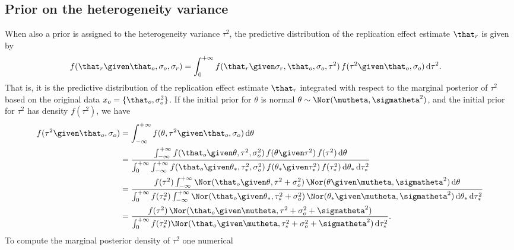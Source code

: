 \begin{subappendices}
\subsection{Prior on the heterogeneity variance}
\label{sec3sup:priortau}
When also a prior is assigned to the heterogeneity variance $\tau^{2}$, the
predictive distribution of the replication effect estimate $\that_{r}$ is given
by
\begin{align*}
  f(\that_{r} \given \that_{o}, \sigma_{o}, \sigma_{r})
  &= \int_{0}^{+\infty} f(\that_{r} \given \sigma_{r}, \that_{o}, \sigma_{o},
    \tau^{2}) \,
    f(\tau^{2} \given \that_{o}, \sigma_{o}) \, \text{d}\tau^{2}.
\end{align*}
That is, it is the predictive distribution of the replication effect estimate
$\that_{r}$ integrated with respect to the marginal posterior of $\tau^{2}$
based on the original data $x_{o} = \{\that_{o}, \sigma^{2}_{o}\}$. If the
initial prior for $\theta$ is normal
$\theta \sim \Nor(\mutheta, \sigmatheta^{2})$, and the initial prior for
$\tau^{2}$ has density $f(\tau^{2})$, we have
\begin{align*}
  f(\tau^{2} \given \that_{o}, \sigma_{o})
  &= \int_{-\infty}^{+\infty} f(\theta, \tau^{2} \given \that_{o}, \sigma_{o}) \, \text{d}\theta \\
  &= \frac{\int_{-\infty}^{+\infty} f(\that_{o} \given \theta, \tau^{2}, \sigma^{2}_{o}) \,
    f(\theta \given \tau^{2}) \, f(\tau^{2}) \, \text{d}\theta}{\int_{0}^{+\infty}
    \int_{-\infty}^{+\infty} f(\that_{o} \given \theta_{*}, \tau^{2}_{*}, \sigma^{2}_{o}) \,
    f(\theta_{*} \given \tau^{2}_{*}) \, f(\tau^{2}_{*}) \, \text{d}\theta_{*} \,
    \text{d}\tau^{2}_{*}} \\
  &= \frac{f(\tau^{2}) \int_{-\infty}^{+\infty} \Nor(\that_{o} \given \theta, \tau^{2}
    + \sigma^{2}_{o}) \, \Nor(\theta \given \mutheta, \sigmatheta^{2}) \,\text{d}\theta
    }{\int_{0}^{+\infty} f(\tau^{2}_{*})
    \int_{-\infty}^{+\infty} \Nor(\that_{o} \given \theta_{*}, \tau^{2}_{*} + \sigma^{2}_{o}) \,
    \Nor(\theta_{*} \given \mutheta, \sigmatheta^{2}) \, \text{d}\theta_{*} \,
    \text{d}\tau^{2}_{*}} \\
  &= \frac{f(\tau^{2}) \, \Nor(\that_{o} \given \mutheta, \tau^{2}
    + \sigma^{2}_{o} + \sigmatheta^{2})
    }{\int_{0}^{+\infty} f(\tau^{2}_{*})
    \Nor(\that_{o} \given \mutheta, \tau^{2}_{*} + \sigma^{2}_{o} + \sigmatheta^{2}) \,
    \text{d}\tau^{2}_{*}}.
\end{align*}
To compute the marginal posterior density of $\tau^{2}$ one numerical

\end{subappendices}
